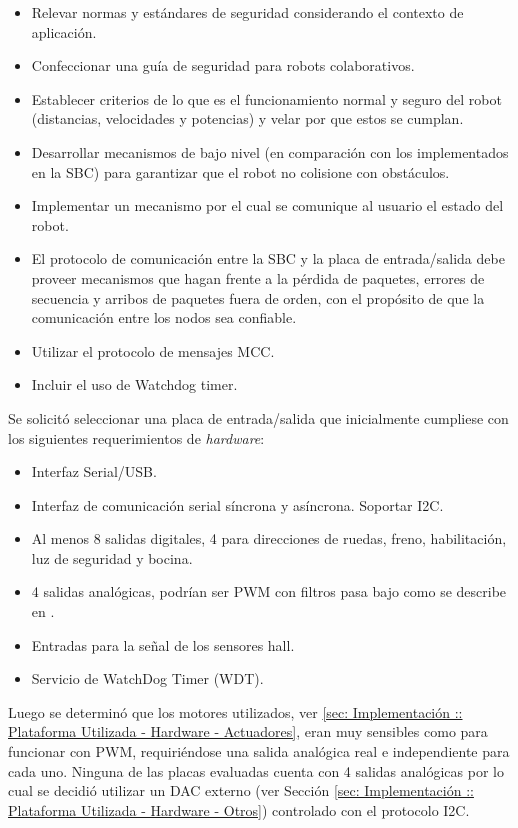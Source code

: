 \documentclass[withindex,glossary]{cam-thesis}
\begin{document}
\begin{itemize}
	\item Relevar normas y estándares de seguridad considerando el contexto de aplicación.
	\item Confeccionar una guía de seguridad para robots colaborativos.
	\item Establecer criterios de lo que es el funcionamiento normal y seguro del robot (distancias, velocidades y potencias) y velar por que estos se cumplan.
	\item Desarrollar mecanismos de bajo nivel (en comparación con los implementados en la SBC) para garantizar que el robot no colisione con obstáculos.
	\item Implementar un mecanismo por el cual se comunique al usuario el estado del robot.	
	\item El protocolo de comunicación entre la SBC y la placa de entrada/salida debe proveer mecanismos que hagan frente a la pérdida de paquetes, errores de secuencia y arribos de paquetes fuera de orden, con el propósito de que la comunicación entre los nodos sea confiable.
	\item Utilizar el protocolo de mensajes MCC.
	\item Incluir el uso de Watchdog timer.
\end{itemize}

Se solicitó seleccionar una placa de entrada/salida que inicialmente cumpliese con los siguientes requerimientos de \textit{hardware}:
\begin{itemize}
    \item Interfaz Serial/USB.
    \item Interfaz de comunicación serial síncrona y asíncrona. Soportar I2C.
    \item Al menos 8 salidas digitales, 4 para direcciones de ruedas, freno, habilitación, luz de seguridad y bocina.
    \item 4 salidas analógicas, podrían ser PWM con filtros pasa bajo como se describe en \cite{AN538}.
    \item Entradas para la señal de los sensores hall.
    \item Servicio de WatchDog Timer (WDT).
\end{itemize}
Luego se determinó que los motores utilizados, ver \ref{sec: Implementación :: Plataforma Utilizada - Hardware - Actuadores}, eran muy sensibles como para funcionar con PWM, requiriéndose una salida analógica real e independiente para cada uno. Ninguna de las placas evaluadas cuenta con 4 salidas analógicas por lo cual se decidió utilizar un \gls{DAC} externo (ver Sección \ref{sec: Implementación :: Plataforma Utilizada - Hardware - Otros}) controlado con el protocolo \gls{I2C}.
\end{document}
